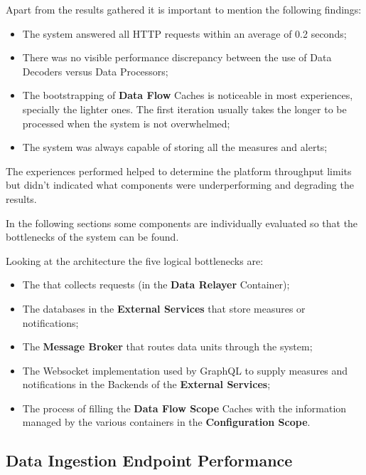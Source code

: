 Apart from the results gathered it is important to mention the following findings:

\begin{itemize}
    \item The system answered all HTTP requests within an average of 0.2 seconds;
    \item There was no visible performance discrepancy between the use of Data Decoders versus Data Processors;
    \item The bootstrapping of \textbf{Data Flow} Caches is noticeable in most experiences, specially the lighter ones. The first iteration usually takes the longer to be processed when the system is not overwhelmed;
    \item The system was always capable of storing all the measures and alerts;
\end{itemize}

The experiences performed helped to determine the platform throughput limits but didn't indicated what components were underperforming and degrading the results.

In the following sections some components are individually evaluated so that the bottlenecks of the system can be found.

Looking at the architecture the five logical bottlenecks are:

\begin{itemize}
    \item The  that collects requests (in the \textbf{Data Relayer} Container);
    \item The databases in the \textbf{External Services} that store measures or notifications;
    \item The \textbf{Message Broker} that routes data units through the system;
    \item The Websocket implementation used by GraphQL to supply measures and notifications in the Backends of the \textbf{External Services};
    \item The process of filling the \textbf{Data Flow Scope} Caches with the information managed by the various containers in the \textbf{Configuration Scope}.
\end{itemize}

\subsection{Data Ingestion Endpoint Performance}
\label{subsec:evaluation:overview:endpoint}

